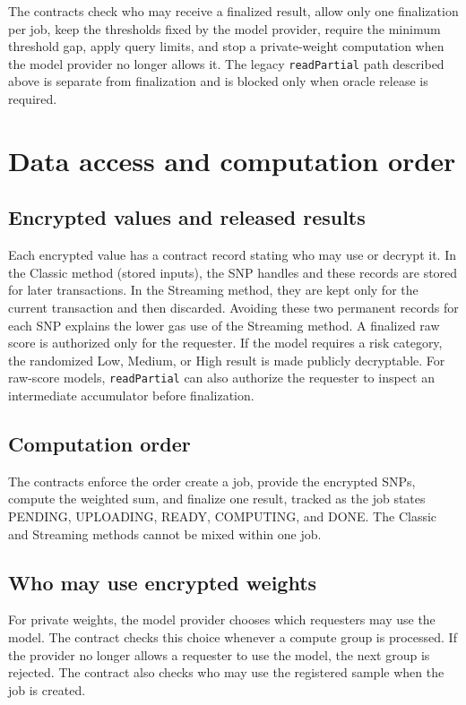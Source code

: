 \documentclass[10pt]{article}
\begin{document}
The contracts check who may receive a finalized result, allow only one finalization per job,
keep the thresholds fixed by the model provider, require the minimum threshold gap,
apply query limits, and stop a private-weight computation when the model provider no
longer allows it.  The legacy \texttt{readPartial} path described above is separate from
finalization and is blocked only when oracle release is required.

\section{Data access and computation order}
\label{sec:data_use}

\subsection{Encrypted values and released results}

Each encrypted value has a contract record stating who may use or decrypt it.  In the
Classic method (stored inputs), the SNP handles and these records are stored for later
transactions.  In the Streaming method, they are kept only for the current transaction
and then discarded.  Avoiding these two permanent records for each SNP explains the
lower gas use of the Streaming method.  A finalized raw score is authorized only for the
requester.  If the model requires a risk category, the randomized Low, Medium, or High
result is made publicly decryptable.  For raw-score models, \texttt{readPartial} can also
authorize the requester to inspect an intermediate accumulator before finalization.

\subsection{Computation order}

The contracts enforce the order create a job, provide the encrypted SNPs, compute the
weighted sum, and finalize one result, tracked as the job states PENDING, UPLOADING,
READY, COMPUTING, and DONE.  The Classic and Streaming methods cannot be mixed within one
job.

\subsection{Who may use encrypted weights}

For private weights, the model provider chooses which requesters may use the model.  The
contract checks this choice whenever a compute group is processed.  If the provider
no longer allows a requester to use the model, the next group is rejected.  The contract
also checks who may use the registered sample when the job is created.
\end{document}

